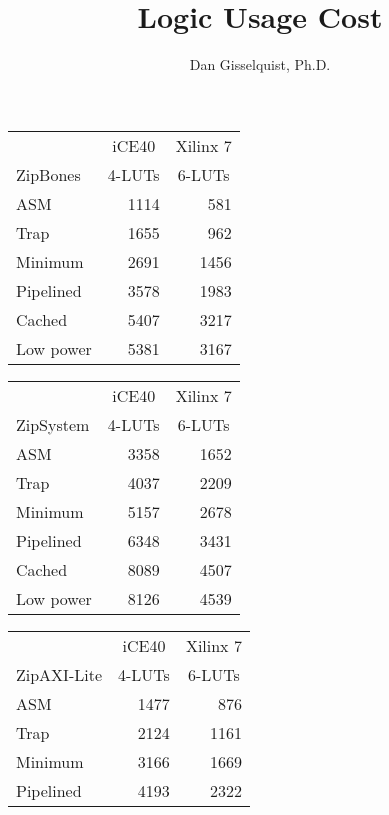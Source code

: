 \documentclass{article}
\title{Logic Usage Cost}
\author{Dan Gisselquist, Ph.D.}
\begin{document}
\maketitle

\begin{center}\begin{tabular}{|l|r|r|}\hline
 & \multicolumn{1}{c}{iCE40} & \multicolumn{1}{|c|}{Xilinx 7} \\
ZipBones & \multicolumn{1}{c}{4-LUTs} & \multicolumn{1}{|c|}{6-LUTs}\\\hline\hline
ASM			& 1114 &  581 \\\hline
Trap			& 1655 &  962 \\\hline
Minimum			& 2691 & 1456 \\\hline
Pipelined		& 3578 & 1983 \\\hline
Cached			& 5407 & 3217 \\\hline
Low power		& 5381 & 3167 \\\hline
\end{tabular}\end{center}


\begin{center}\begin{tabular}{|l|r|r|}\hline
 & \multicolumn{1}{c}{iCE40} & \multicolumn{1}{|c|}{Xilinx 7} \\
ZipSystem &\multicolumn{1}{c}{4-LUTs} & \multicolumn{1}{|c|}{6-LUTs}\\\hline\hline
ASM			& 3358 & 1652 \\\hline
Trap			& 4037 & 2209 \\\hline
Minimum			& 5157 & 2678 \\\hline
Pipelined		& 6348 & 3431 \\\hline
Cached			& 8089 & 4507 \\\hline
Low power		& 8126 & 4539 \\\hline
\end{tabular}\end{center}


\begin{center}\begin{tabular}{|l|r|r|}\hline
 & \multicolumn{1}{c}{iCE40} & \multicolumn{1}{c|}{Xilinx 7} \\
ZipAXI-Lite & \multicolumn{1}{c}{4-LUTs} & \multicolumn{1}{|c|}{6-LUTs}\\\hline\hline
ASM			& 1477 &  876 \\\hline
Trap			& 2124 & 1161 \\\hline
Minimum			& 3166 & 1669 \\\hline
Pipelined		& 4193 & 2322 \\\hline
\end{tabular}\end{center}
\end{document}
